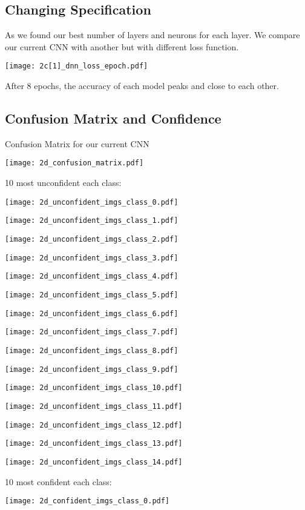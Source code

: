 \documentclass[11pt]{article}
\begin{document}
\subsection{Changing Specification}

As we found our best number of layers and neurons for each layer. We compare our current CNN with another but with different loss function.

\texttt{[image: 2c[1]\_dnn\_loss\_epoch.pdf]}

After 8 epochs, the accuracy of each model peaks and close to each other.

\subsection{Confusion Matrix and Confidence}

Confusion Matrix for our current CNN

\texttt{[image: 2d\_confusion\_matrix.pdf]}

10 most unconfident each class:

\texttt{[image: 2d\_unconfident\_imgs\_class\_0.pdf]}

\texttt{[image: 2d\_unconfident\_imgs\_class\_1.pdf]}

\texttt{[image: 2d\_unconfident\_imgs\_class\_2.pdf]}

\texttt{[image: 2d\_unconfident\_imgs\_class\_3.pdf]}

\texttt{[image: 2d\_unconfident\_imgs\_class\_4.pdf]}

\texttt{[image: 2d\_unconfident\_imgs\_class\_5.pdf]}

\texttt{[image: 2d\_unconfident\_imgs\_class\_6.pdf]}

\texttt{[image: 2d\_unconfident\_imgs\_class\_7.pdf]}

\texttt{[image: 2d\_unconfident\_imgs\_class\_8.pdf]}

\texttt{[image: 2d\_unconfident\_imgs\_class\_9.pdf]}

\texttt{[image: 2d\_unconfident\_imgs\_class\_10.pdf]}

\texttt{[image: 2d\_unconfident\_imgs\_class\_11.pdf]}

\texttt{[image: 2d\_unconfident\_imgs\_class\_12.pdf]}

\texttt{[image: 2d\_unconfident\_imgs\_class\_13.pdf]}

\texttt{[image: 2d\_unconfident\_imgs\_class\_14.pdf]}

10 most confident each class:

\texttt{[image: 2d\_confident\_imgs\_class\_0.pdf]}
\end{document}

